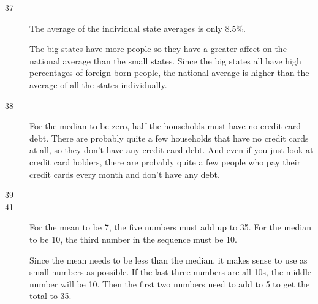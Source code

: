 \documentclass{exam}
\begin{document}
\begin{description}
\begin{parts}
        \end{parts}

      \item[37]
        The average of the individual state averages is only 8.5\%.

        The big states have more people so they have a greater affect on the
        national average than the small states.  Since the big states all have
        high percentages of foreign-born people, the national average is higher
        than the average of all the states individually.

      \item[38]
        For the median to be zero, half the households must have no credit card
        debt.  There are probably quite a few households that have no credit
        cards at all, so they don't have any credit card debt.  And even if you
        just look at credit card holders, there are probably quite a few people
        who pay their credit cards every month and don't have any debt.

      \item[39]

      \item[41]
        For the mean to be 7, the five numbers must add up to 35.  For the
        median to be 10, the third number in the sequence must be 10.

        Since the mean needs to be less than the median, it makes sense to use
        as small numbers as possible.  If the last three numbers are all 10s,
        the middle number will be 10.  Then the first two numbers need to add
        to 5 to get the total to 35.


\end{description}
\end{document}
